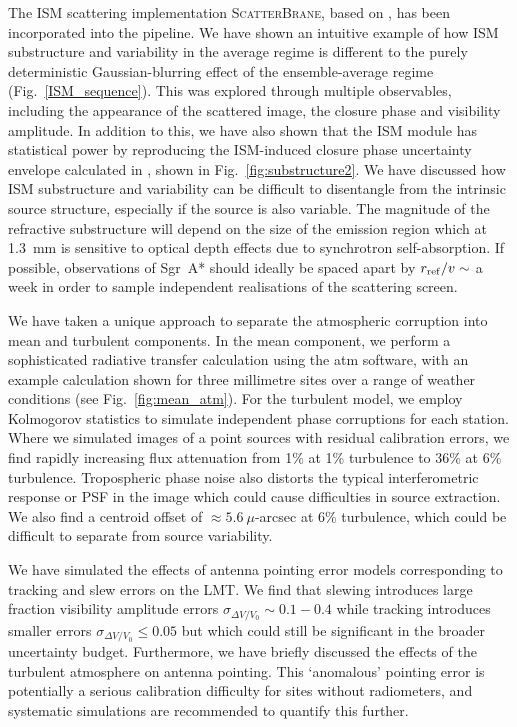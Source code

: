 The ISM scattering implementation \textsc{ScatterBrane}, based on \citet*{Johnson_2015a}, has been incorporated into the pipeline.
We have shown an intuitive example of how ISM substructure and variability in the average regime is different to the purely deterministic Gaussian-blurring effect of the ensemble-average regime (Fig.~\ref{ISM_sequence}). This was explored through multiple observables, including the appearance of the scattered image, the closure phase and visibility amplitude.
In addition to this, we have also shown that the ISM module has statistical power by reproducing the ISM-induced closure phase uncertainty envelope calculated in \citet{Ortiz_2016}, shown in Fig.~\ref{fig:substructure2}.
We have discussed how ISM substructure and variability can be difficult to disentangle from the intrinsic source structure, especially if the source is also variable. The magnitude of the refractive substructure will depend on the size of the emission region which at 1.3~mm is sensitive to optical depth effects due to synchrotron self-absorption. If possible, observations of Sgr~A* should ideally be spaced apart by $r_{\rm ref}/v \sim$ a week in order to sample independent realisations of the scattering screen. 

We have taken a unique approach to separate the atmospheric corruption into mean and turbulent components. In the mean component, we perform a sophisticated radiative transfer calculation using the {\sc atm} software, with an example calculation shown for three millimetre sites over a range of weather conditions (see Fig.~\ref{fig:mean_atm}).
For the turbulent model, we employ Kolmogorov statistics to simulate independent phase corruptions for each station. Where we simulated images of a point sources with residual calibration errors, we find rapidly increasing flux attenuation from 1\% at 1\% turbulence to 36\% at 6\% turbulence. Tropospheric phase noise also distorts the typical interferometric response or PSF in the image which could cause difficulties in source extraction. We also find a centroid offset of $\approx 5.6\ \mu$-arcsec at 6\% turbulence, which could be difficult to separate from source variability.


We have simulated the effects of antenna pointing error models corresponding to tracking and slew errors on the LMT. We find that slewing introduces large fraction visibility amplitude errors $\sigma_{\Delta V/V_0} \sim 0.1 - 0.4$ while tracking introduces smaller errors $\sigma_{\Delta V/V_0} \le 0.05$ but which could still be significant in the broader uncertainty budget. Furthermore, we have briefly discussed the effects of the turbulent atmosphere on antenna pointing. This `anomalous' pointing error is potentially a serious calibration difficulty for sites without radiometers, and systematic simulations are recommended to quantify this further. 

